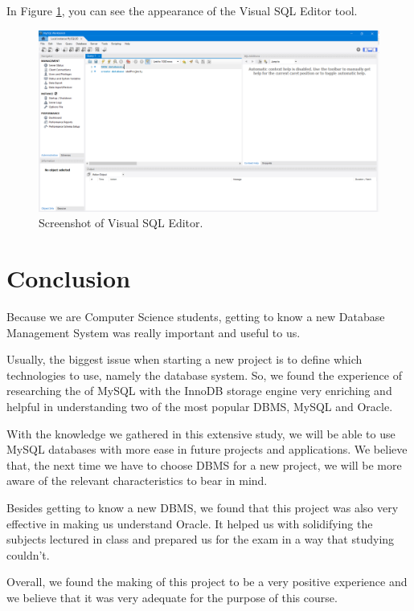 \documentclass[12pt]{article}
\begin{document}
In Figure \ref{visualEditorImage}, you can see the appearance of the Visual SQL Editor tool.

\begin{figure}[htbp]
\centering
    \includegraphics[scale=0.2]{files/workbench.png}
    \caption{Screenshot of Visual SQL Editor.}
    \label{visualEditorImage}
\end{figure}




\newpage
\section{Conclusion}
\label{conclusion}
Because we are Computer Science students, getting to know a new Database Management System was really important and useful to us.

Usually, the biggest issue when starting a new project is to define which technologies to use, namely the database system. So, we found the experience of researching the  of MySQL with the InnoDB storage engine very enriching and helpful in understanding two of the most popular DBMS, MySQL and Oracle.

With the knowledge we gathered in this extensive study, we will be able to use MySQL databases with more ease in future projects and applications. We believe that, the next time we have to choose DBMS for a new project, we will be more aware of the relevant characteristics to bear in mind.

Besides getting to know a new DBMS, we found that this project was also very effective in making us understand Oracle. It helped us with solidifying the subjects lectured in class and prepared us for the exam in a way that  studying couldn't.

Overall, we found the making of this project to be a very positive experience and we believe that it was very adequate for the purpose of this course.


\newpage
\printbibliography[
heading=bibintoc,
title={References}
]
\end{document}
